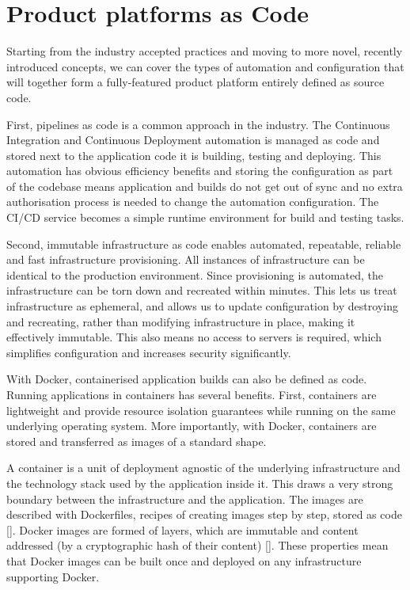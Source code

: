 \documentclass[reprint,amsmath,amssymb,aps]{revtex4-1}
\begin{document}
\section{\label{sec:ascode}Product platforms as Code}

Starting from the industry accepted practices and moving to more novel, recently introduced concepts, we can cover the types of automation and configuration that will together form a fully-featured product platform entirely defined as source code.

First, pipelines as code is a common approach in the industry. The Continuous Integration and Continuous Deployment automation is managed as code and stored next to the application code it is building, testing and deploying. This automation has obvious efficiency benefits and storing the configuration as part of the codebase means application and builds do not get out of sync and no extra authorisation process is needed to change the automation configuration. The CI/CD service becomes a simple runtime environment for build and testing tasks.

Second, immutable infrastructure as code enables automated, repeatable, reliable and fast infrastructure provisioning. All instances of infrastructure can be identical to the production environment. Since provisioning is automated, the infrastructure can be torn down and recreated within minutes. This lets us treat infrastructure as ephemeral, and allows us to update configuration by destroying and recreating, rather than modifying infrastructure in place, making it effectively immutable. This also means no access to servers is required, which simplifies configuration and increases security significantly.

With Docker, containerised application builds can also be defined as code. Running applications in containers has several benefits. First, containers are lightweight and provide resource isolation guarantees while running on the same underlying operating system. More importantly, with Docker, containers are stored and transferred as images of a standard shape.

A container is a unit of deployment agnostic of the underlying infrastructure and the technology stack used by the application inside it. This draws a very strong boundary between the infrastructure and the application. The images are described with Dockerfiles, recipes of creating images step by step, stored as code []. Docker images are formed of layers, which are immutable and content addressed (by a cryptographic hash of their content) []. These properties mean that Docker images can be built once and deployed on any infrastructure supporting Docker.
\end{document}
